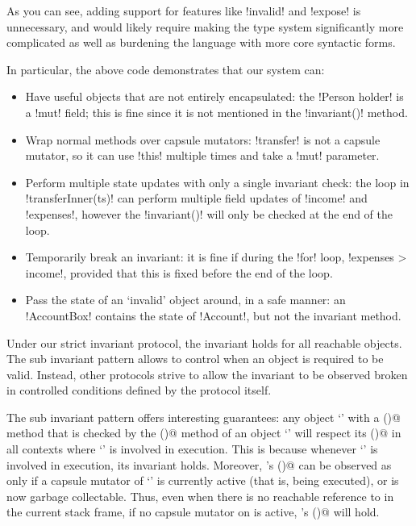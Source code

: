 As you can see, adding support for features like \Q!invalid! and \Q!expose! is unnecessary, and would likely require making the type system significantly more complicated as well as burdening the language with more core syntactic forms.

In particular, the above code demonstrates that our system can:
\begin{itemize}
\item Have useful objects that are not entirely encapsulated: the \Q!Person holder! is a \Q!mut! field; this is fine since it is not mentioned in the \Q!invariant()! method.
\item Wrap normal methods over capsule mutators: \Q!transfer! is not a capsule mutator, so it can use \Q!this! multiple times and take a \Q!mut! parameter.
\item Perform multiple state updates with only a single invariant check: the loop in \Q!transferInner(ts)! can perform multiple field updates of \Q!income! and \Q!expenses!, however the \Q!invariant()! will only be checked at the end of the loop.
\item Temporarily break an invariant: it is fine if during the \Q!for! loop, \Q!expenses > income!, provided that this is fixed before the end of the loop.
\item Pass the state of an `invalid' object around, in a safe manner: an \Q!AccountBox! contains the state of \Q!Account!, but not the invariant method.
\end{itemize}

Under our strict invariant protocol, the invariant holds for all reachable objects.
The sub invariant pattern allows to control when an object is required to be valid.
Instead, other protocols strive to allow the invariant to be observed broken in controlled conditions defined by the protocol itself.

The sub invariant pattern offers interesting guarantees:
any object `\Q@a@' with a \Q@subInvariant()@ method that is checked by the \Q@invariant()@ method of an object `\Q@b@'
will respect its \Q@subInvariant()@ in all contexts where `\Q@b@' is involved in execution.
This is because whenever `\Q@b@' is involved in execution, its invariant holds.
Moreover, \Q@a@'s \Q@subInvariant()@ can be observed as \Q@false@ only if a capsule mutator of `\Q@b@' is currently active (that is, being executed),
or \Q@b@ is now garbage collectable.
Thus, even when there is no reachable reference to \Q@b@ in the current stack frame,
if no capsule mutator on \Q@b@ is active, \Q@a@'s \Q@subInvariant()@ will hold.

